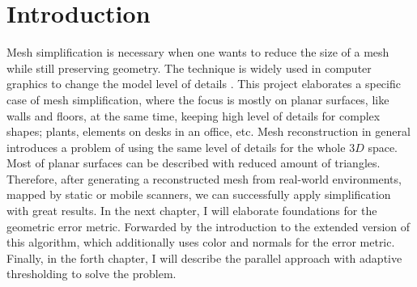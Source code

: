 \chapter{Introduction}
\setcounter{page}{1}%
\thispagestyle{empty}

Mesh simplification is necessary when one wants to reduce the size of a mesh while still preserving geometry. The technique is widely used in computer graphics to change the model level of details \cite{lod03}. This project elaborates a specific case of mesh simplification, where the focus is mostly on planar surfaces, like walls and floors, at the same time, keeping high level of details for complex shapes; plants, elements on desks in an office, etc. Mesh reconstruction in general introduces a problem of using the same level of details for the whole $3D$ space. Most of planar surfaces can be described with reduced amount of triangles. Therefore, after generating a reconstructed mesh from real-world environments, mapped by static or mobile scanners, we can successfully apply simplification with great results. In the next chapter, I will elaborate foundations for the geometric error metric. Forwarded by the introduction to the extended version of this algorithm, which additionally uses color and normals for the error metric. Finally, in the forth chapter, I will describe the parallel approach with adaptive thresholding to solve the problem.